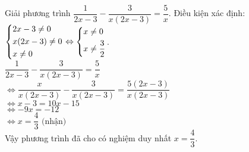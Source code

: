 \begin{bt}%
	Giải phương trình $\dfrac{1}{2x-3} - \dfrac{3}{x(2x-3)} = \dfrac{5}{x}$.
	\loigiai
	{
		Điều kiện xác định: $\left\{\begin{aligned}& 2x - 3 \neq 0 \\& x(2x-3) \neq 0 \\& x \neq 0\end{aligned}\right. \Leftrightarrow \left\{\begin{aligned}& x \neq 0 \\& x \neq \dfrac{3}{2}\end{aligned}\right.$.\\
		\hspace*{0.6cm} $\dfrac{1}{2x-3} - \dfrac{3}{x(2x-3)} = \dfrac{5}{x}$\\
		$\Leftrightarrow \dfrac{x}{x(2x-3)} - \dfrac{3}{x(2x-3)} = \dfrac{5(2x-3)}{x(2x-3)}$\\
		$\Leftrightarrow x - 3 = 10x - 15$\\
		$\Leftrightarrow -9x = -12$\\
		$\Leftrightarrow x = \dfrac{4}{3} \text{ (nhận)}$\\
		Vậy phương trình đã cho có nghiệm duy nhất $x = \dfrac{4}{3}$.
	}
\end{bt}


